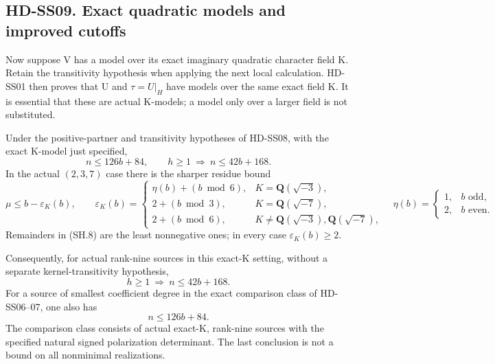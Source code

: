 \subsection*{HD-SS09. Exact quadratic models and improved cutoffs}

Now suppose V has a model over its exact imaginary quadratic
character field K. Retain the transitivity hypothesis when applying
the next local calculation. HD-SS01 then proves that U and
\(\tau=U|_H\) have models over the same exact field K.
It is essential that these are actual K-models; a model only over
a larger field is not substituted.

\begin{proposition}[HD-SS09]
Under the positive-partner and transitivity hypotheses of HD-SS08,
with the exact K-model just specified,
\[
                     n\le126b+84,\qquad
             h\ge1\ \Longrightarrow\ n\le42b+168.
 \tag{SH.7}
\]
In the actual \((2,3,7)\) case there is the sharper residue bound
\[
 \mu\le b-\varepsilon_K(b),\qquad
 \varepsilon_K(b)=
 \begin{cases}
  \eta(b)+(b\bmod6),&K=\mathbf Q(\sqrt{-3}),\\
  2+(b\bmod3),&K=\mathbf Q(\sqrt{-7}),\\
  2+(b\bmod6),&K\ne\mathbf Q(\sqrt{-3}),\mathbf Q(\sqrt{-7}),
 \end{cases}
 \quad
 \eta(b)=\begin{cases}1,&b\text{ odd},\\2,&b\text{ even}.
 \end{cases}
 \tag{SH.8}
\]
Remainders in (SH.8) are the least nonnegative ones; in every case
\(\varepsilon_K(b)\ge2\).

Consequently, for actual rank-nine sources in this exact-K setting,
without a separate kernel-transitivity hypothesis,
\[
 h\ge1\ \Longrightarrow\ n\le42b+168.
 \tag{SH.9}
\]
For a source of smallest coefficient degree in the exact comparison
class of HD-SS06--07, one also has
\[
                              n\le126b+84.
 \tag{SH.10}
\]
The comparison class consists of actual exact-K, rank-nine sources
with the specified natural signed polarization determinant. The
last conclusion is not a bound on all nonminimal realizations.
\end{proposition}


